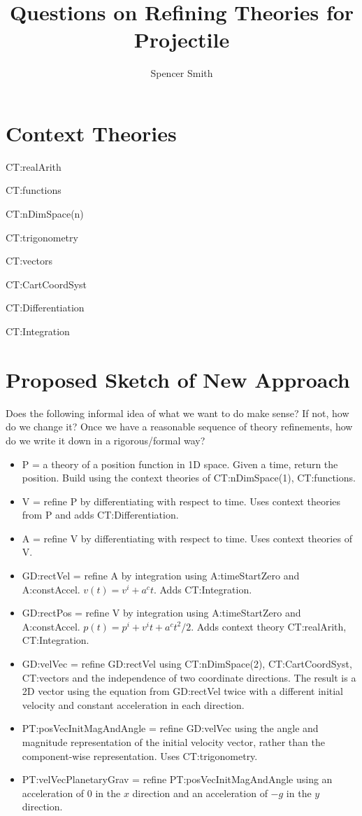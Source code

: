 \documentclass{article}
\title{Questions on Refining Theories for Projectile}
\author{Spencer Smith}
\begin{document}
\maketitle

\section{Context Theories}

\noindent CT:realArith

\noindent CT:functions

\noindent CT:nDimSpace(n)

\noindent CT:trigonometry

\noindent CT:vectors

\noindent CT:CartCoordSyst

\noindent CT:Differentiation

\noindent CT:Integration

\section{Proposed Sketch of New Approach}

Does the following informal idea of what we want to do make sense?  If not, how
do we change it?  Once we have a reasonable sequence of theory refinements, how
do we write it down in a rigorous/formal way?

\begin{itemize}
\item P = a theory of a position function in 1D space.  Given a time, return the
position.  Build using the context theories of CT:nDimSpace(1), CT:functions.
\item V = refine P by differentiating with respect to time. Uses context
theories from P and adds CT:Differentiation.
\item A = refine V by differentiating with respect to time.  Uses context theories of V.
\item GD:rectVel = refine A by integration using A:timeStartZero and
A:constAccel. $v(t) = v^i + a^c t$. Adds CT:Integration.
\item GD:rectPos = refine V by integration using A:timeStartZero and A:constAccel. $p(t) = p^i + v^i t + a^c t^2/2$.  Adds context theory CT:realArith, CT:Integration.
\item GD:velVec = refine GD:rectVel using CT:nDimSpace(2), CT:CartCoordSyst,
CT:vectors and the independence of two coordinate directions. The result is a 2D
vector using the equation from GD:rectVel twice with a different initial
velocity and constant acceleration in each direction.
\item PT:posVecInitMagAndAngle = refine GD:velVec using the angle and magnitude
representation of the initial velocity vector, rather than the component-wise
representation.  Uses CT:trigonometry.
\item PT:velVecPlanetaryGrav = refine PT:posVecInitMagAndAngle using an
acceleration of 0 in the $x$ direction and an acceleration of $-g$ in the $y$
direction.
\end{itemize}
\end{document}
